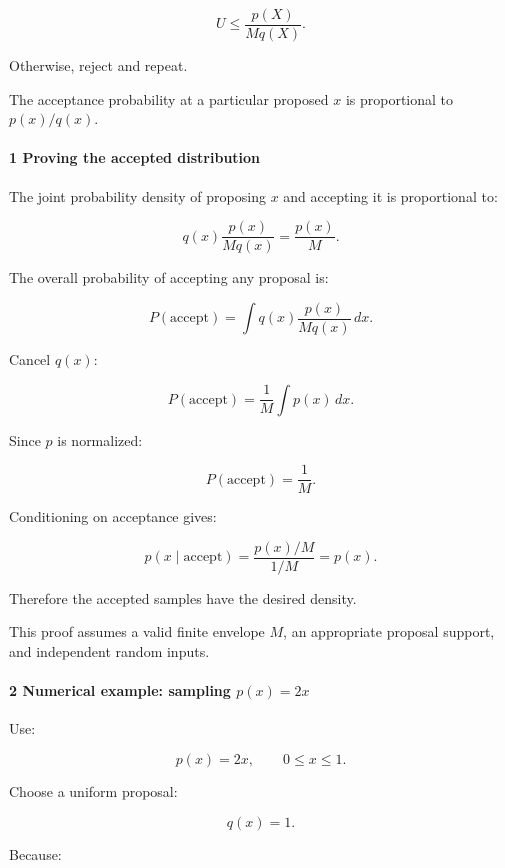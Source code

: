 \[
 \boxed{ U\le\frac{p(X)}{Mq(X)} }.
\]

Otherwise, reject and repeat.

The acceptance probability at a particular proposed \(x\) is proportional to \(p(x)/q(x)\).

\paragraph{1 Proving the accepted distribution}\label{02-foundations-ii-ch029-proving-the-accepted-distribution}

\hypertarget{02-foundations-ii-ch029-proving-the-accepted-distribution}{}

The joint probability density of proposing \(x\) and accepting it is proportional to:

\[
 q(x)\frac{p(x)}{Mq(x)} = \frac{p(x)}M.
\]

The overall probability of accepting any proposal is:

\[
 P(\text{accept}) = \int q(x)\frac{p(x)}{Mq(x)}\,dx.
\]

Cancel \(q(x)\):

\[
 P(\text{accept}) = \frac1M\int p(x)\,dx.
\]

Since \(p\) is normalized:

\[
 \boxed{ P(\text{accept})=\frac1M }.
\]

Conditioning on acceptance gives:

\[
 p(x\mid\text{accept}) = \frac{p(x)/M}{1/M} =p(x).
\]

Therefore the accepted samples have the desired density.

This proof assumes a valid finite envelope \(M\), an appropriate proposal support, and independent random inputs.

\paragraph{\texorpdfstring{2 Numerical example: sampling \(p(x)=2x\)}{2 Numerical example: sampling p(x)=2x}}\label{02-foundations-ii-ch029-numerical-example-sampling-px2x}

\hypertarget{02-foundations-ii-ch029-numerical-example-sampling-px2x}{}

Use:

\[
 p(x)=2x,\qquad0\le x\le1.
\]

Choose a uniform proposal:

\[
 q(x)=1.
\]

Because:

